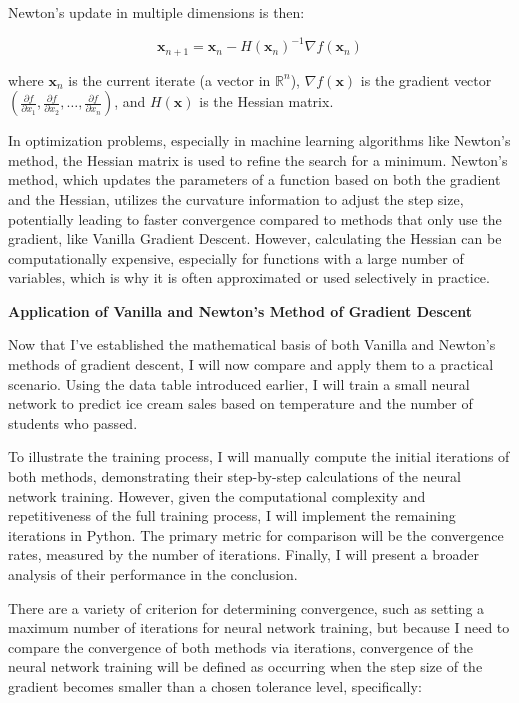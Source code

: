 \documentclass[12pt]{article}
\theoremstyle{definition}
\begin{document}
Newton's update in multiple dimensions is then:

\[
\mathbf{x}_{n+1} = \mathbf{x}_n - H(\mathbf{x}_n)^{-1} \nabla f(\mathbf{x}_n)
\]

where \( \mathbf{x}_n \) is the current iterate (a vector in \( \mathbb{R}^n \)),
\( \nabla f(\mathbf{x}) \) is the gradient vector \( \left( \frac{\partial f}{\partial x_1}, \frac{\partial f}{\partial x_2}, \dots, \frac{\partial f}{\partial x_n} \right) \), and \( H(\mathbf{x}) \) is the Hessian matrix.

In optimization problems, especially in machine learning algorithms like Newton's method, the Hessian matrix is used to refine the search for a minimum. Newton's method, which updates the parameters of a function based on both the gradient and the Hessian, utilizes the curvature information to adjust the step size, potentially leading to faster convergence compared to methods that only use the gradient, like Vanilla Gradient Descent. However, calculating the Hessian can be computationally expensive, especially for functions with a large number of variables, which is why it is often approximated or used selectively in practice.

\begin{flushleft}
\textbf{Application of Vanilla and Newton's Method of Gradient Descent}
\end{flushleft}
Now that I've established the mathematical basis of both Vanilla and Newton's methods of gradient descent, I will now compare and apply them to a practical scenario. Using the data table introduced earlier, I will train a small neural network to predict ice cream sales based on temperature and the number of students who passed.

To illustrate the training process, I will manually compute the initial iterations of both methods, demonstrating their step-by-step calculations of the neural network training. However, given the computational complexity and repetitiveness of the full training process, I will implement the remaining iterations in Python. The primary metric for comparison will be the convergence rates, measured by the number of iterations. Finally, I will present a broader analysis of their performance in the conclusion.


There are a variety of criterion for determining convergence, such as setting a maximum number of iterations for neural network training, but because I need to compare the convergence of both methods via iterations, convergence of the neural network training will be defined as occurring when the step size of the gradient becomes smaller than a chosen tolerance level, specifically:  
\end{document}
